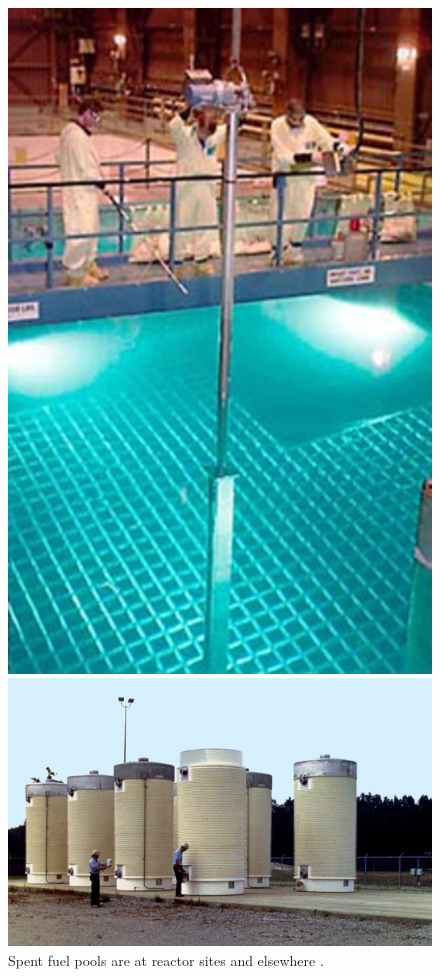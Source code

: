 

  \begin{figure}[htbp!]
    \begin{center}
    \begin{minipage}[t]{0.45\textwidth}
      \includegraphics{pool.eps}
      \caption{Spent fuel pools are at reactor sites and elsewhere \cite{pools}.}
        \label{fig:pool}
      \includegraphics{casks.eps}

\end{minipage}
\end{center}
\end{figure}
